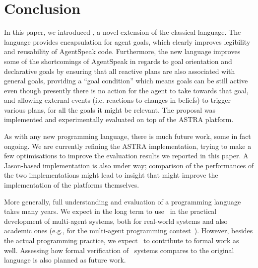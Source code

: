 \section{Conclusion}
\label{sec:conclusion}

In this paper, we introduced \aser, a novel extension of the classical
{\asl} language. The language provides encapsulation for agent
goals, which clearly improves legibility and reusability of AgentSpeak
code. Furthermore, the new language improves some of the shortcomings
of AgentSpeak in regards to goal orientation and declarative goals by
ensuring that all reactive plans are also associated with general
goals, providing a ``goal condition'' which means goals can be still
active even though presently there is no action for the agent to take
towards that goal, and allowing external events (i.e. reactions to
changes in beliefs) to trigger various plans, for all the goals it
might be relevant.  The proposal was implemented and 
experimentally evaluated on top of the ASTRA platform.

As with any new programming language, there is much future work, some
in fact ongoing. We are currently refining the ASTRA implementation,
trying to make a few optimisations to improve the evaluation results we
reported in this paper. A Jason-based implementation is also under
way; comparison of the performances of the two implementations might
lead to insight that might improve the implementation of the platforms
themselves. 

More generally, full understanding and evaluation of a programming
language takes many years. We expect in the long term to use \aser\ in
the practical development of multi-agent systems, both for real-world
systems and also academic ones (e.g., for the multi-agent programming
contest~\cite{Albrecht18}). However, besides the actual programming
practice, we expect \aser\ to contribute to formal work as
well. Assessing how formal verification of \aser\ systems compares to
the original language is also planned as future work.


